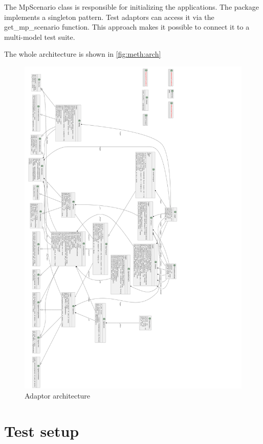 The MpScenario class is responsible for initializing the applications. The package implements a singleton pattern. Test adaptors can access it via the get\_mp\_scenario function. This approach makes it possible to connect it to a multi-model test suite.

The whole architecture is shown in \autoref{fig:meth:arch}

\begin{figure}
    \centering
    \includegraphics[width=140mm, keepaspectratio]{figures/classes.png}
    \caption{Adaptor architecture}
    \label{fig:meth:arch}
\end{figure}

\section{Test setup}
\label{sec:meth:ts}

